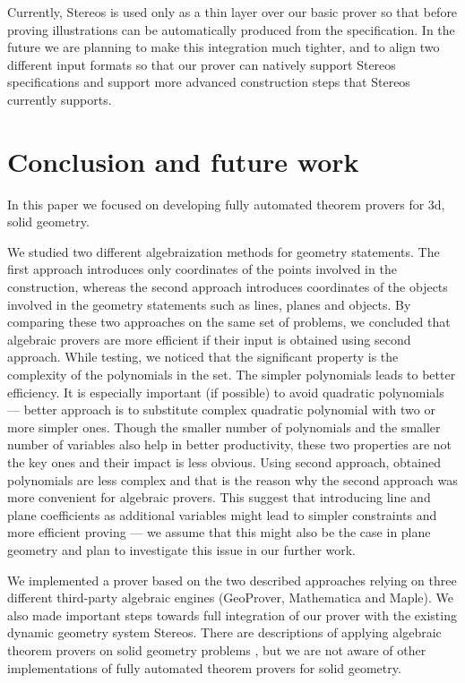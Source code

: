 \documentclass[final,1p,times,authoryear]{elsarticle}
\begin{document}
Currently, Stereos is used only as a thin layer over our basic prover
so that before proving illustrations can be automatically produced
from the specification. In the future we are planning to make this
integration much tighter, and to align two different input formats so
that our prover can natively support Stereos specifications and
support more advanced construction steps that Stereos currently
supports.

\section{Conclusion and future work}

In this paper we focused on developing fully automated theorem provers
for 3d, solid geometry.

We studied two different algebraization methods for geometry
statements. The first approach introduces only coordinates of the
points involved in the construction, whereas the second approach
introduces coordinates of the objects involved in the geometry
statements such as lines, planes and objects. By comparing these two
approaches on the same set of problems, we concluded that algebraic
provers are more efficient if their input is obtained using second
approach. While testing, we noticed that the significant property is
the complexity of the polynomials in the set. The simpler polynomials
leads to better efficiency. It is especially important (if possible)
to avoid quadratic polynomials --- better approach is to substitute
complex quadratic polynomial with two or more simpler ones. Though the
smaller number of polynomials and the smaller number of variables also
help in better productivity, these two properties are not the key ones
and their impact is less obvious. Using second approach, obtained
polynomials are less complex and that is the reason why the second
approach was more convenient for algebraic provers. This suggest that
introducing line and plane coefficients as additional variables might
lead to simpler constraints and more efficient proving --- we assume
that this might also be the case in plane geometry and plan to
investigate this issue in our further work.

We implemented a prover based on the two described approaches relying
on three different third-party algebraic engines (GeoProver,
Mathematica and Maple). We also made important steps towards full
integration of our prover with the existing dynamic geometry system
Stereos. There are descriptions of applying algebraic theorem provers
on solid geometry problems \cite{shao2016challenging}, but we are not
aware of other implementations of fully automated theorem provers for
solid geometry.
\end{document}
